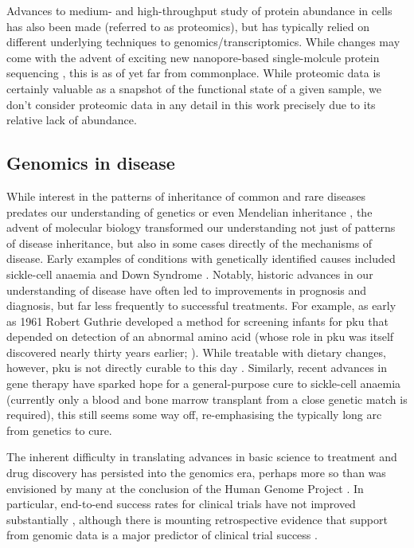 \documentclass[thesis.tex]{subfiles}
\begin{document}
Advances to medium- and high-throughput study of protein abundance in cells has also been made (referred to as proteomics), but has typically relied on different underlying techniques to genomics/transcriptomics. While changes may come with the advent of exciting new nanopore-based single-molcule protein sequencing \citep{afshar_bakshloo_nanopore-based_2022, motone_not_2023}, this is as of yet far from commonplace. While proteomic data is certainly valuable as a snapshot of the functional state of a given sample, we don't consider proteomic data in any detail in this work precisely due to its relative lack of abundance. 


\subsection{Genomics in disease}
While interest in the patterns of inheritance of common and rare diseases predates our understanding of genetics or even Mendelian inheritance \citep{emery_joseph_1989}, the advent of molecular biology transformed our understanding not just of patterns of disease inheritance, but also in some cases directly of the mechanisms of disease. Early examples of conditions with genetically identified causes included sickle-cell anaemia \citep{ingram_specific_1956} and Down Syndrome \citep{lejeune_human_1959}. Notably, historic advances in our understanding of disease have often led to improvements in prognosis and diagnosis, but far less frequently to successful treatments. For example, as early as 1961 Robert Guthrie developed a method for screening infants for \gls{pku} that depended on detection of an abnormal amino acid (whose role in \gls{pku} was itself discovered nearly thirty years earlier; \citealp{folling_uber_1934}). While treatable with dietary changes, however, \gls{pku} is not directly curable to this day \citep{mohanty_century_2014}. Similarly, recent advances in gene therapy have sparked hope for a general-purpose cure to sickle-cell anaemia (currently only a blood and bone marrow transplant from a close genetic match is required), this still seems some way off, re-emphasising the typically long arc from genetics to cure.

The inherent difficulty in translating advances in basic science to treatment and drug discovery has persisted into the genomics era, perhaps more so than was envisioned by many at the conclusion of the Human Genome Project \citep{emilien_impact_2000}. In particular, end-to-end success rates for clinical trials have not improved substantially \citep{dowden_trends_2019}, although there is mounting retrospective evidence that support from genomic data is a major predictor of clinical trial success \citep{nelson_support_2015, king_are_2019}.
\end{document}
